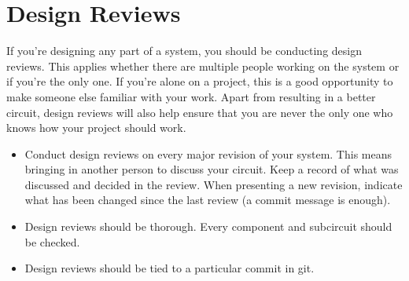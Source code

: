 \documentclass{article}
\begin{document}
\section{Design Reviews}
If you're designing any part of a system, you should be conducting design reviews. This applies whether there are multiple people working on the system or if you're the only one. If you're alone on a project, this is a good opportunity to make someone else familiar with your work. Apart from resulting in a better circuit, design reviews will also help ensure that you are never the only one who knows how your project should work.
\begin{itemize}
\item  Conduct design reviews on every major revision of your system. This means bringing in another person to discuss your circuit. Keep a record of what was discussed and decided in the review. When presenting a new revision, indicate what has been changed since the last review (a commit message is enough).
\item Design reviews should be thorough. Every component and subcircuit should be checked.
\item Design reviews should be tied to a particular commit in git.
\end{itemize}
\end{document}
